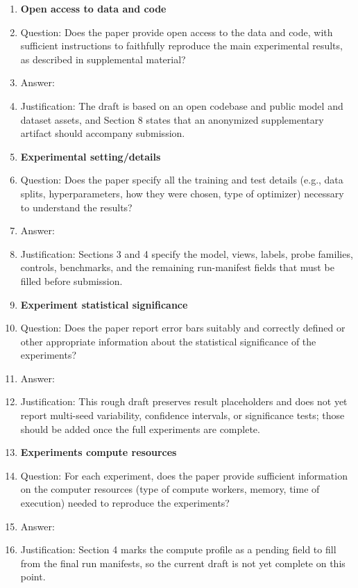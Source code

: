 \begin{enumerate}
\item {\bf Open access to data and code}
    \item[] Question: Does the paper provide open access to the data and code, with sufficient instructions to faithfully reproduce the main experimental results, as described in supplemental material?
    \item[] Answer: \answerYes{}
    \item[] Justification: The draft is based on an open codebase and public model and dataset assets, and Section 8 states that an anonymized supplementary artifact should accompany submission.

\item {\bf Experimental setting/details}
    \item[] Question: Does the paper specify all the training and test details (e.g., data splits, hyperparameters, how they were chosen, type of optimizer) necessary to understand the results?
    \item[] Answer: \answerYes{}
    \item[] Justification: Sections 3 and 4 specify the model, views, labels, probe families, controls, benchmarks, and the remaining run-manifest fields that must be filled before submission.

\item {\bf Experiment statistical significance}
    \item[] Question: Does the paper report error bars suitably and correctly defined or other appropriate information about the statistical significance of the experiments?
    \item[] Answer: \answerNo{}
    \item[] Justification: This rough draft preserves result placeholders and does not yet report multi-seed variability, confidence intervals, or significance tests; those should be added once the full experiments are complete.

\item {\bf Experiments compute resources}
    \item[] Question: For each experiment, does the paper provide sufficient information on the computer resources (type of compute workers, memory, time of execution) needed to reproduce the experiments?
    \item[] Answer: \answerNo{}
    \item[] Justification: Section 4 marks the compute profile as a pending field to fill from the final run manifests, so the current draft is not yet complete on this point.
    

\end{enumerate}
